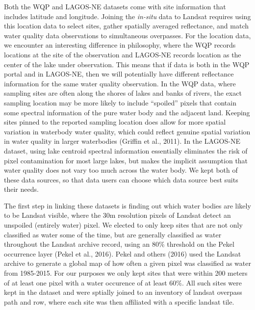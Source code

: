 \documentclass[]{article}
\begin{document}
Both the WQP and LAGOS-NE datasets come with site information that
includes latitude and longitude. Joining the \emph{in-situ} data to
Landsat requires using this location data to select sites, gather
spatially averaged reflectance, and match water quality data
observations to simultaneous overpasses. For the location data, we
encounter an interesting difference in philosophy, where the WQP records
locations at the site of the observation and LAGOS-NE records location
as the center of the lake under observation. This means that if data is
both in the WQP portal and in LAGOS-NE, then we will potentially have
different reflectance information for the same water quality
observation. In the WQP data, where sampling sites are often along the
shores of lakes and banks of rivers, the exact sampling location may be
more likely to include ``spoiled'' pixels that contain some spectral
information of the pure water body and the adjacent land. Keeping sites
pinned to the reported sampling location does allow for more spatial
variation in waterbody water quality, which could reflect genuine
spatial variation in water quality in larger waterbodies (Griffin et
al., 2011). In the LAGOS-NE dataset, using lake centroid spectral
information essentially eliminates the risk of pixel contamination for
most large lakes, but makes the implicit assumption that water quality
does not vary too much across the water body. We kept both of these data
sources, so that data users can choose which data source best suits
their needs.

The first step in linking these datasets is finding out which water
bodies are likely to be Landsat visible, where the 30m resolution pixels
of Landsat detect an unspoiled (entirely water) pixel. We elected to
only keep sites that are not only classified as water some of the time,
but are generally classified as water throughout the Landsat archive
record, using an 80\% threshold on the Pekel occurrence layer (Pekel et
al., 2016). Pekel and others (2016) used the Landsat archive to generate
a global map of how often a given pixel was classified as water from
1985-2015. For our purposes we only kept sites that were within 200
meters of at least one pixel with a water occurence of at least 60\%.
All such sites were kept in the dataset and were sptially joined to an
inventory of landsat overpass path and row, where each site was then
affiliated with a specific landsat tile.
\end{document}
